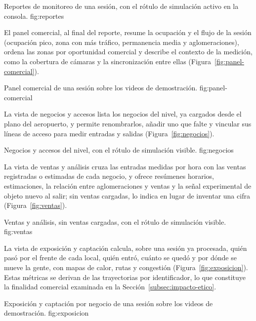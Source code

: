   {Reportes de monitoreo de una sesión, con el rótulo de simulación activo en la consola.}
  {fig:reportes}

El panel comercial, al final del reporte, resume la ocupación y el flujo de la sesión (ocupación
pico, zona con más tráfico, permanencia media y aglomeraciones), ordena las zonas por
oportunidad comercial y describe el contexto de la medición, como la cobertura de cámaras y la
sincronización entre ellas (Figura~\ref{fig:panel-comercial}).

  {Panel comercial de una sesión sobre los videos de demostración.}
  {fig:panel-comercial}

La vista de negocios y accesos lista los negocios del nivel, ya cargados desde el plano del
aeropuerto, y permite renombrarlos, añadir uno que falte y vincular sus líneas de acceso para
medir entradas y salidas (Figura~\ref{fig:negocios}).

  {Negocios y accesos del nivel, con el rótulo de simulación visible.}
  {fig:negocios}

La vista de ventas y análisis cruza las entradas medidas por hora con las ventas registradas o
estimadas de cada negocio, y ofrece resúmenes horarios, estimaciones, la relación entre
aglomeraciones y ventas y la señal experimental de objeto nuevo al salir; sin ventas cargadas, lo
indica en lugar de inventar una cifra (Figura~\ref{fig:ventas}).

  {Ventas y análisis, sin ventas cargadas, con el rótulo de simulación visible.}
  {fig:ventas}

La vista de exposición y captación calcula, sobre una sesión ya procesada, quién pasó por el
frente de cada local, quién entró, cuánto se quedó y por dónde se mueve la gente, con mapas de
calor, rutas y congestión (Figura~\ref{fig:exposicion}). Estas métricas se derivan de las
trayectorias por identificador, lo que constituye la finalidad comercial examinada en la
Sección~\ref{subsec:impacto-etico}.

  {Exposición y captación por negocio de una sesión sobre los videos de demostración.}
  {fig:exposicion}

